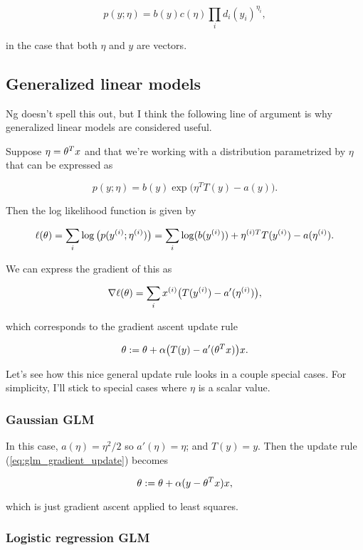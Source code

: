 \documentclass[]{article}
\begin{document}
\[p(y;\eta) = b(y)c(\eta)\prod_i d_i(y_i)^{\eta_i},\]

in the case that both \(\eta\) and \(y\) are vectors.

\subsection{Generalized linear models}\label{generalized-linear-models}

Ng doesn't spell this out, but I think the following line of argument is
why generalized linear models are considered useful.

Suppose \(\eta = \theta^Tx\) and that we're working with a distribution
parametrized by \(\eta\) that can be expressed as

\[p(y;\eta) = b(y)\exp\big(\eta^TT(y)-a(y)\big).\]

Then the log likelihood function is given by

\[\ell(\theta) = \sum_i\log\big(p(y^{(i)};\eta^{(i)})\big)
= \sum_i\log(b(y^{(i)})) + \eta^{(i)T}T(y^{(i)})-a(\eta^{(i)}).\]

We can express the gradient of this as

\[\nabla\ell(\theta) = \sum_i x^{(i)}\big(T(y^{(i)})-a'(\eta^{(i)})\big),\]

which corresponds to the gradient ascent update rule

\begin{equation}\theta := \theta + \alpha\big(T(y)-a'(\theta^Tx)\big)x.\label{eq:glm_gradient_update}\end{equation}

Let's see how this nice general update rule looks in a couple special
cases. For simplicity, I'll stick to special cases where \(\eta\) is a
scalar value.

\subsubsection{Gaussian GLM}\label{gaussian-glm}

In this case, \(a(\eta) = \eta^2/2\) so \(a'(\eta) = \eta\); and
\(T(y)=y\). Then the update rule (\ref{eq:glm_gradient_update}) becomes

\[\theta := \theta + \alpha(y-\theta^Tx)x,\]

which is just gradient ascent applied to least squares.

\subsubsection{Logistic regression GLM}\label{logistic-regression-glm}
\end{document}
